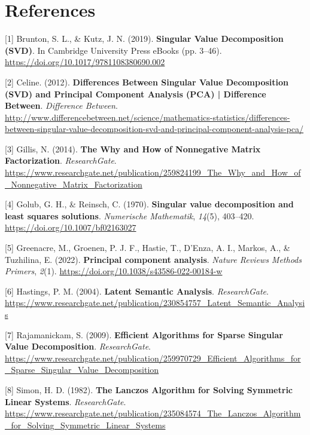 \documentclass[a4paper]{article}
\begin{document}
	\section{References}
	{\justifying
		
		[1]   Brunton, S. L., \& Kutz, J. N. (2019). \textbf{Singular Value Decomposition (SVD)}. In Cambridge University Press eBooks (pp. 3–46). \url{https://doi.org/10.1017/9781108380690.002}
		
		[2]   Celine. (2012). \textbf{Differences Between Singular Value Decomposition (SVD) and Principal Component Analysis (PCA) | Difference Between}. \textit{Difference Between}. \url{http://www.differencebetween.net/science/mathematics-statistics/differences-between-singular-value-decomposition-svd-and-principal-component-analysis-pca/}
		
		[3]   Gillis, N. (2014). \textbf{The Why and How of Nonnegative Matrix Factorization}. \textit{ResearchGate}. \url{https://www.researchgate.net/publication/259824199_The_Why_and_How_of_Nonnegative_Matrix_Factorization}
		
		[4]   Golub, G. H., \& Reinsch, C. (1970). \textbf{Singular value decomposition and least squares solutions}. \textit{Numerische Mathematik}, \textit{14}(5), 403–420. \url{https://doi.org/10.1007/bf02163027}
		
		[5]   Greenacre, M., Groenen, P. J. F., Hastie, T., D’Enza, A. I., Markos, A., \& Tuzhilina, E. (2022). \textbf{Principal component analysis}. \textit{Nature Reviews Methods Primers}, \textit{2}(1). \url{https://doi.org/10.1038/s43586-022-00184-w}
		
		[6]   Hastings, P. M. (2004). \textbf{Latent Semantic Analysis}. \textit{ResearchGate}. \url{https://www.researchgate.net/publication/230854757_Latent_Semantic_Analysis}
		
		[7]   Rajamanickam, S. (2009). \textbf{Efficient Algorithms for Sparse Singular Value Decomposition}. \textit{ResearchGate}. \url{https://www.researchgate.net/publication/259970729_Efficient_Algorithms_for_Sparse_Singular_Value_Decomposition}
		
		[8]   Simon, H. D. (1982). \textbf{The Lanczos Algorithm for Solving Symmetric Linear Systems}. \textit{ResearchGate}. \url{https://www.researchgate.net/publication/235084574_The_Lanczos_Algorithm_for_Solving_Symmetric_Linear_Systems}
	}
	
	
	
	
	
	
	
\end{document}
